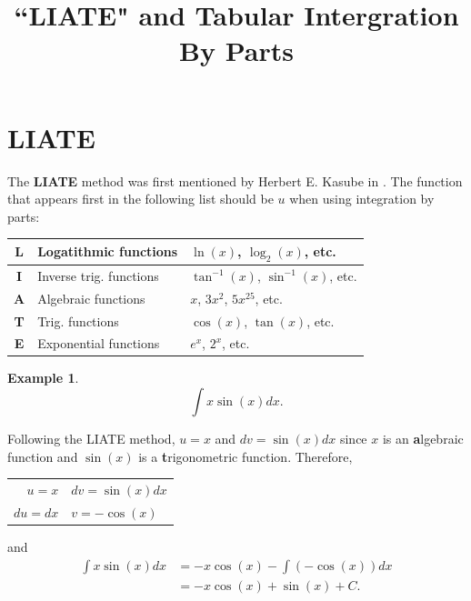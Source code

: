 \documentclass[reqno]{amsart}
\theoremstyle{definition}
\newtheorem{eg}{Example}
\numberwithin{equation}{section}
\begin{document}
\title{``LIATE" and Tabular Intergration By Parts}

\address{Nathan Reff\\Department of Mathematics\\Alfred University\\ Alfred, NY 14802, U.S.A.}

\maketitle

\section{LIATE}
The {\bf LIATE} method was first mentioned by Herbert E. Kasube in \cite{Kasube}.  The function that appears first in the following list should be $u$ when using integration by parts:

\begin{center}
\begin{tabular}{ |c|l|l|}
\hline
  {\bf L} & Logatithmic functions  &  $\ln(x)$, $\log_2(x)$, etc. \\
\hline
  {\bf I} & Inverse trig. functions  &  $\tan^{-1}(x)$, $\sin^{-1}(x)$, etc. \\
\hline
  {\bf A} & Algebraic functions  &  $x$, $3x^2$, $5x^{25}$, etc. \\
\hline
  {\bf T} & Trig. functions  &  $\cos(x)$, $\tan(x)$, etc. \\
\hline
  {\bf E} & Exponential functions  &  $e^x$, $2^x$, etc. \\
\hline
\end{tabular}
\end{center}

\begin{eg}  \[ \int x\sin(x) dx.\]

Following the LIATE method, $u=x$ and $dv=\sin(x)dx$ since $x$ is an {\bf a}lgebraic function and $\sin(x)$ is a {\bf t}rigonometric function.  Therefore,

\begin{center}
  \begin{tabular}{ r||l}
    $u=x$ & $dv=\sin(x) dx$ \\ 
    $du=dx$ & $v=-\cos(x)$\\ 
  \end{tabular}
\end{center}
\noindent and 
\begin{align*} \int x \sin(x) dx &= -x \cos(x) - \int (-\cos(x)) dx \\
&= -x \cos(x) + \sin(x) +C.
\end{align*}
\end{eg}
\end{document}
